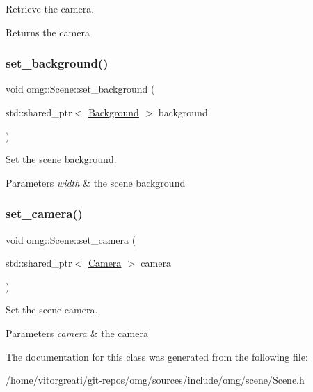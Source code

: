 Retrieve the camera. 

\begin{DoxyReturn}{Returns}
the camera 
\end{DoxyReturn}
\mbox{\label{classomg_1_1_scene_a66a4d47f99b8cf56d0ffeec665400d56}} 
\subsubsection{\texorpdfstring{set\_background()}{set\_background()}}
{\footnotesize\ttfamily void omg\+::\+Scene\+::set\+\_\+background (\begin{DoxyParamCaption}\item[{std\+::shared\+\_\+ptr$<$ \mbox{\hyperlink{classomg_1_1_background}{Background}} $>$}]{background }\end{DoxyParamCaption})\hspace{0.3cm}{\ttfamily [inline]}}



Set the scene background. 


\begin{DoxyParams}{Parameters}
{\em width} & the scene background \\
\hline
\end{DoxyParams}
\mbox{\label{classomg_1_1_scene_a07875fddcc199bc2f70b1c20fd294af4}} 
\subsubsection{\texorpdfstring{set\_camera()}{set\_camera()}}
{\footnotesize\ttfamily void omg\+::\+Scene\+::set\+\_\+camera (\begin{DoxyParamCaption}\item[{std\+::shared\+\_\+ptr$<$ \mbox{\hyperlink{classomg_1_1_camera}{Camera}} $>$}]{camera }\end{DoxyParamCaption})\hspace{0.3cm}{\ttfamily [inline]}}



Set the scene camera. 


\begin{DoxyParams}{Parameters}
{\em camera} & the camera \\
\hline
\end{DoxyParams}


The documentation for this class was generated from the following file\+:\begin{DoxyCompactItemize}
\item 
/home/vitorgreati/git-\/repos/omg/sources/include/omg/scene/Scene.\+h\end{DoxyCompactItemize}
